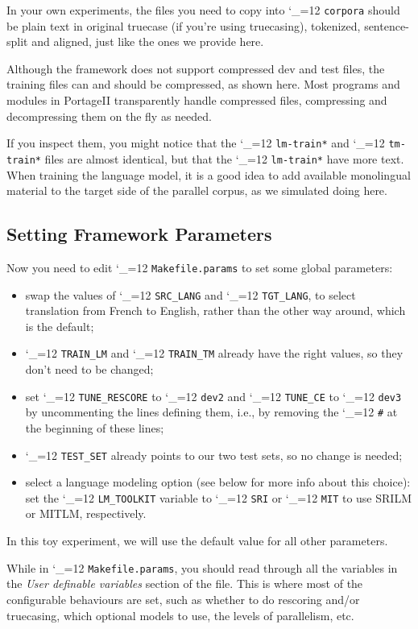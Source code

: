 \documentclass[11pt,letterpaper]{article}
\newcommand{\PS}{PortageII\xspace}
\def\code{\begingroup\catcode`\_=12 \codex}
\newcommand{\codex}[1]{\texttt{#1}\endgroup}
\begin{document}
In your own experiments, the files you need to copy into \code{corpora}
should be plain text in original truecase (if you're using truecasing),
tokenized, sentence-split and aligned, just like the ones we provide here.

Although the framework does not support compressed dev and test files, the
training files can and should be compressed, as shown here.  Most programs and
modules in \PS transparently handle compressed files, compressing and
decompressing them on the fly as needed.

If you inspect them, you might notice that the \code{lm-train*} and
\code{tm-train*} files are almost identical, but that the \code{lm-train*} have
more text.  When training the language model, it is a good idea to add
available monolingual material to the target side of the parallel corpus, as we
simulated doing here.

\subsection{Setting Framework Parameters} \label{FrameworkParams}

Now you need to edit \code{Makefile.params} to set some global parameters:
\begin{itemize}
\item swap the values of \code{SRC_LANG} and
\code{TGT_LANG}, to select translation from French to English, rather than
the other way around, which is the default;
\item \code{TRAIN_LM} and \code{TRAIN_TM} already have the right values, so
they don't need to be changed;
\item set \code{TUNE_RESCORE} to \code{dev2} and \code{TUNE_CE} to \code{dev3}
by uncommenting the lines defining them, i.e., by removing the \code{\#} at the
beginning of these lines;
\item \code{TEST_SET} already points to our two test sets, so no change is
needed;
\item select a language modeling option (see below for more info about this
  choice): set the \code{LM_TOOLKIT} variable to \code{SRI} or \code{MIT} to
  use SRILM or MITLM, respectively.
\end{itemize}
In this toy experiment, we will use the default value for all other parameters.

While in \code{Makefile.params}, you should read through all the variables in
the \emph{User definable variables} section of the file.  This is where most of
the configurable behaviours are set, such as whether to do rescoring and/or
truecasing, which optional models to use, the levels of parallelism, etc.
\end{document}
